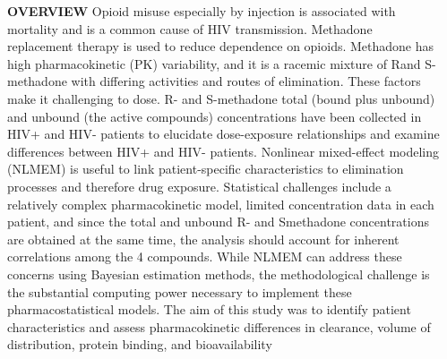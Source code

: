 \documentclass[final]{beamer}
\newlength{\sepwidth}
\newlength{\colwidth}
\newcommand{\separatorcolumn}{\begin{column}{\sepwidth}\end{column}}
\begin{document}
\begin{frame}[t]
\begin{columns}[t]
\separatorcolumn

\begin{column}{\colwidth}

  \begin{block}{\textbf{OVERVIEW}}
Opioid misuse especially by injection is associated with mortality and is
a common cause of HIV transmission. Methadone replacement
therapy is used to reduce dependence on opioids. Methadone has
high pharmacokinetic (PK) variability, and it is a racemic mixture of Rand
S-methadone with differing activities and routes of elimination.
These factors make it challenging to dose. R- and S-methadone total
(bound plus unbound) and unbound (the active compounds)
concentrations have been collected in HIV+ and HIV- patients to
elucidate dose-exposure relationships and examine differences
between HIV+ and HIV- patients. Nonlinear mixed-effect modeling
(NLMEM) is useful to link patient-specific characteristics to elimination
processes and therefore drug exposure. Statistical challenges include
a relatively complex pharmacokinetic model, limited concentration data
in each patient, and since the total and unbound R- and Smethadone
concentrations are obtained at the same time, the analysis
should account for inherent correlations among the 4 compounds.
While NLMEM can address these concerns using Bayesian estimation
methods, the methodological challenge is the substantial computing
power necessary to implement these pharmacostatistical models. The
aim of this study was to identify patient characteristics and assess
pharmacokinetic differences in clearance, volume of distribution,
protein binding, and bioavailability


\end{block}
\end{column}
\end{columns}
\end{frame}
\end{document}
